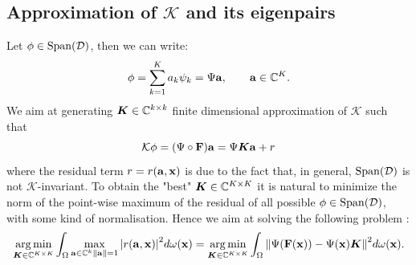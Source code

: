 \subsection{Approximation of $\mathcal{K}$ and its eigenpairs}
Let $\phi\in\mathrm{Span}(\mathcal{D})$, then we can write:
\begin{equation*}
    \phi = \sum_{k=1}^K a_k\psi_k = \Psi\vb{a}, \qquad \vb{a}\in\mathbb{C}^K.
\end{equation*}
We aim at generating $\vb*{K}\in\mathbb{C}^{k\times k}$ finite dimensional approximation of $\mathcal{K}$ such that
\begin{equation}
    \label{k_finite_dimensional}
    \mathcal{K}\vb{\phi} = (\Psi \circ \vb{F})\vb{a} = \Psi\vb*K\vb{a} + r
\end{equation}
where the residual term $r = r(\vb{a}, \vb{x})$ is due to the fact that, in general, $\mathrm{Span}(\mathcal{D})$ is not $\mathcal{K}$-invariant. To obtain the "best" $\vb*{K}\in\mathbb{C}^{K\times K}$ it is natural to minimize the norm of the point-wise maximum of the residual of all possible $\phi\in\mathrm{Span}(\mathcal{D})$, with some kind of normalisation. Hence we aim at solving the following problem \cite{colbrook_rigorous_2021}:
\begin{equation}
    \label{edmd_integral_problem}
    \operatorname*{arg\,min}_{\vb*{K}\in\mathbb{C}^{K\times K}}\int_{\Omega} \max_{\vb{a}\in\mathbb{C}^k \\ \norm{\vb{a}} = 1}\abs{r(\vb{a}, \vb{x})}^2 d\omega(\vb{x}) = 
    \operatorname*{arg\,min}_{\vb*{K}\in\mathbb{C}^{K\times K}}\int_{\Omega} \norm{\Psi(\vb{F}(\vb{x})) - \Psi(\vb{x})\vb*{K}}^2 d\omega(\vb{x}).
\end{equation}

